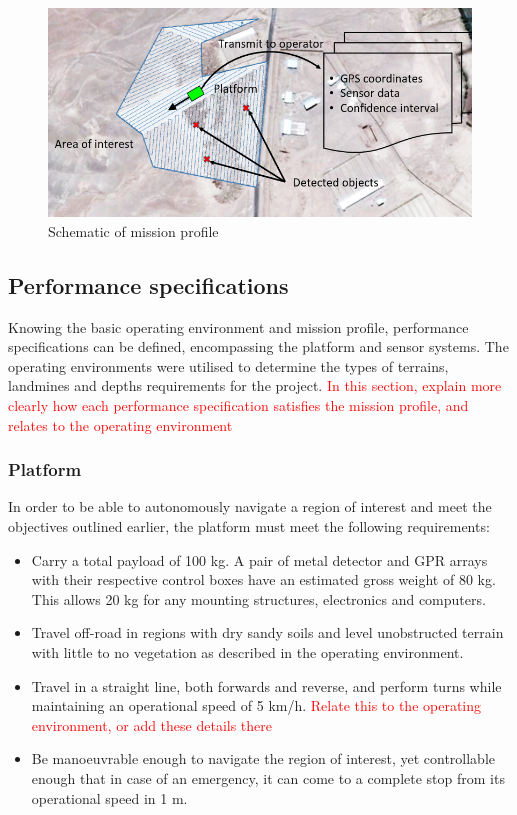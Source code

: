 \documentclass[main.tex]{subfiles}
\begin{document}
\begin{figure}[ht]
\centering
\includegraphics[width=\textwidth]{1-Introduction/SoO.PNG}
\caption{Schematic of mission profile}
\end{figure}

\subsection{Performance specifications}
Knowing the basic operating environment and mission profile, performance specifications can be defined, encompassing the platform and sensor systems. The operating environments were utilised to determine the types of terrains, landmines and depths requirements for the project.   \textcolor{red}{In this section, explain more clearly how each performance specification satisfies the mission profile, and relates to the operating environment}

\subsubsection{Platform}
In order to be able to autonomously navigate a region of interest and meet the objectives outlined earlier, the platform must meet the following requirements: 
\begin{itemize}
 \item Carry a total payload of 100 kg. A pair of metal detector and GPR arrays with their respective control boxes have an estimated gross weight of 80 kg. This allows 20 kg for any mounting structures,  electronics and computers. 
 \item Travel off-road in regions with dry sandy soils and level unobstructed terrain with little to no vegetation as described in the operating environment.
\item Travel in a straight line, both forwards and reverse, and perform turns while maintaining an operational speed of 5 km/h. \textcolor{red}{Relate this to the operating environment, or add these details there}
\item Be manoeuvrable enough to navigate the region of interest, yet controllable enough that in case of an emergency, it can come to a complete stop from its operational speed in 1 m.
\end{itemize}
\end{document}
